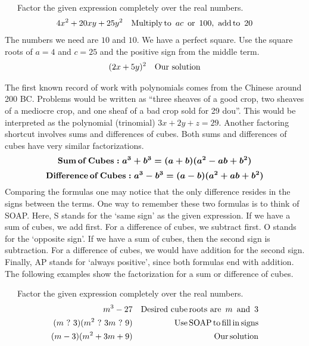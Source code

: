 \begin{example}~~~Factor the given expression completely over the real numbers.
  \begin{eqnarray*}
    4 x^2 + 20 x y + 25 y^2 &  & \operatorname{Multiply} \operatorname{to~} ac \operatorname{~or~}100, \operatorname{~add} \operatorname{to~} 20
  \end{eqnarray*}
	The numbers we need are $10$ and $10$.  We have a perfect square.  Use the square roots of $a=4$ and $c=25$ and the positive sign from the middle term.
  \begin{eqnarray*}
    (2 x + 5 y)^2 &  & \operatorname{Our~solution}
  \end{eqnarray*}
\end{example}
 
{} The first known record of work with polynomials
comes from the Chinese around 200 BC. Problems would be written as ``three
sheaves of a good crop, two sheaves of a mediocre crop, and one sheaf of a bad
crop sold for 29 dou''. This would be interpreted as the polynomial (trinomial) $3 x + 2 y + z
= 29$.
\newpage
Another factoring shortcut involves sums and differences of cubes.  Both sums and differences of cubes have very similar
factorizations.
\[ \boldsymbol{\operatorname{Sum} \operatorname{of} \operatorname{Cubes} : a^3 + b^3 = (a + b) (a^2 -
   ab + b^2)} \]
\[ \boldsymbol{\operatorname{Difference} \operatorname{of} \operatorname{Cubes} : a^3 - b^3 = (a - b)
   (a^2 + ab + b^2)} \]
Comparing the formulas one may notice that the only difference resides in the signs
between the terms. One way to remember these two formulas is to think of
SOAP. Here, S stands for the `same sign' as the given expression. If we have a sum of cubes, we add
first.  For a difference of cubes, we subtract first.  O stands for the `opposite sign'. If
we have a sum of cubes, then the second sign is subtraction.  For a difference of cubes, we would have
addition for the second sign.  Finally, AP stands for `always positive', since both
formulas end with addition. The following examples show the factorization for a sum or difference of cubes.
\begin{example}~~~Factor the given expression completely over the real numbers.
  \begin{eqnarray*}
    m^3 - 27 &  & \operatorname{Desired~cube} \operatorname{roots~are~} m \operatorname{~and~}
    3\\
    (m~?~3) (m^2 ~?~ 3m ~?~9) &  & \operatorname{Use} \operatorname{SOAP}
    \operatorname{to} \operatorname{fill} \operatorname{in} \operatorname{signs}\\
    (m - 3) (m^2 + 3 m + 9) &  & \operatorname{Our} \operatorname{solution}
  \end{eqnarray*}
\end{example}

